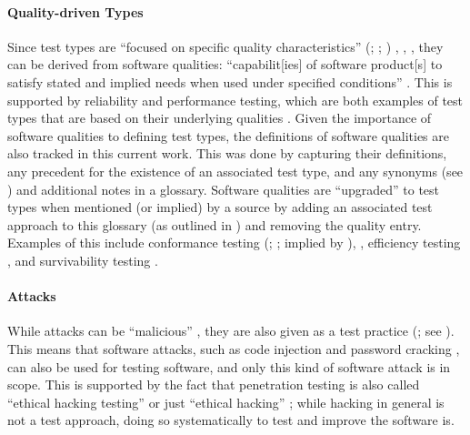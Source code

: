     \paragraph{Quality-driven Types}
    \label{qual-test}

    Since test types are ``focused on specific quality characteristics''
    \ifnotpaper
        (\citealp[p.~15]{IEEE2022}; \citeyear[p.~7]{IEEE2021};
        \citeyear[p.~473]{IEEE2017})%
    \else
        \cite[p.~15]{IEEE2022}, \cite[p.~7]{IEEE2021}, \cite[p.~473]{IEEE2017}%
    \fi, they can be derived from software qualities: ``capabilit[ies] of
    software product[s] to satisfy stated and implied needs when used under
    specified conditions'' \citep[p.~424]{IEEE2017}. This
    is supported by reliability and performance testing, which are both examples of
    test types \citep{IEEE2022, IEEE2021} that are based on their underlying
    qualities \citep[p.~18]{FentonAndPfleeger1997}.
    Given the importance of software qualities to defining test types, the
    definitions of \qualityCount{} software qualities are also tracked in this
    current work. This was done by capturing their
    definitions, any precedent for the existence of an associated test type,
    and any synonyms (see ) and additional notes in a glossary.
    Software qualities are ``upgraded'' to test types when mentioned (or
    implied) by a source by adding an associated test approach to this glossary
    (as outlined in ) and removing the quality entry. Examples
    of this include conformance testing \ifnotpaper
        (\citealp[p.~5\=/7]{SWEBOK2024}; \citealp[p.~25]{JardEtAl1999}; implied
        by \citealp[p.~93]{IEEE2017})\else \cite[p.~5\=/7]{SWEBOK2024},
        \cite[p.~25]{JardEtAl1999}\fi, efficiency testing
    \citep[p.~44]{Kam2008}, and survivability testing \citep[p.~40]{GhoshAndVoas1999}.

    \paragraph{Attacks}
    \label{attacks}
    While attacks can be ``malicious'' \citep[p.~7]{IEEE2017}, they are also
    given as a test practice (\citeyear[p.~34]{IEEE2022}; see ).
    This means that software attacks, such as code injection and password
    cracking \citepISTQB{}, can also be used for testing software, and only
    this kind of software attack is in scope. This is supported by the fact
    that penetration testing is also called ``ethical hacking testing''
    \citep[p.~13-4]{SWEBOK2024} or just ``ethical hacking''
    \citep[p.~28]{Gerrard2000b}; while hacking in general is not a test
    approach, doing so systematically to test and improve the software is.

